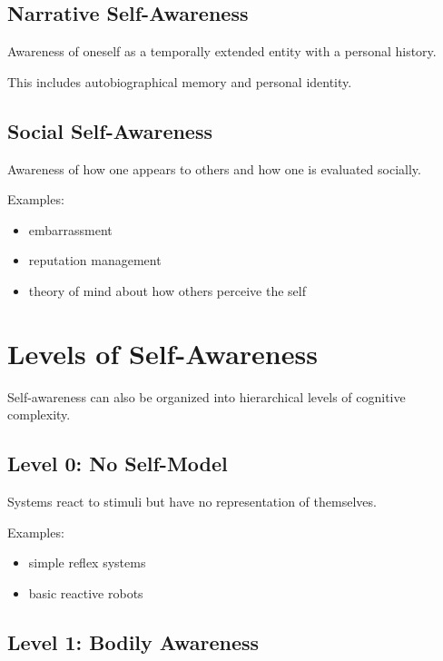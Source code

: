 \documentclass{article}
\begin{document}
      \subsection{Narrative Self-Awareness}

         Awareness of oneself as a temporally extended entity with a personal history.

         This includes autobiographical memory and personal identity.

      \subsection{Social Self-Awareness}

         Awareness of how one appears to others and how one is evaluated socially.

         Examples:

         \begin{itemize}
            \item embarrassment
            \item reputation management
            \item theory of mind about how others perceive the self
         \end{itemize}


   \section{Levels of Self-Awareness}

      Self-awareness can also be organized into hierarchical levels of cognitive complexity.

      \subsection{Level 0: No Self-Model}

         Systems react to stimuli but have no representation of themselves.

         Examples:

         \begin{itemize}
            \item simple reflex systems
            \item basic reactive robots
         \end{itemize}

      \subsection{Level 1: Bodily Awareness}
\end{document}
